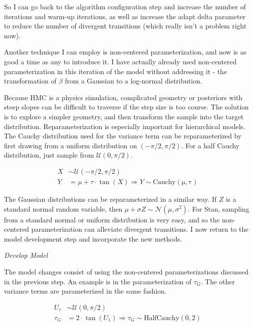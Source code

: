 \documentclass[11pt, oneside, openany]{scrbook}
\begin{document}
So I can go back to the algorithm configuration step and increase the number of iterations and warm-up iterations, as well as increase the adapt delta parameter to reduce the number of divergent transitions (which really isn't a problem right now).

Another technique I can employ is non-centered parameterization, and now is as good a time as any to introduce it. I have actually already used non-centered parameterization in this iteration of the model without addressing it - the transformation of \(\beta\) from a Gaussian to a log-normal distribution.

Because HMC is a physics simulation, complicated geometry or posteriors with steep slopes can be difficult to traverse if the step size is too course. The solution is to explore a simpler geometry, and then transform the sample into the target distribution. Reparameterization is especially important for hierarchical models. The Cauchy distribution used for the variance term can be reparameterized by first drawing from a uniform distribution on \((-\pi/2, \pi/2)\). For a half Cauchy distribution, just sample from \(\mathcal{U}(0, \pi/2)\).


\begin{align*}
X &\sim \mathcal{U}(-\pi/2, \pi/2) \\
Y &= \mu + \tau \cdot \tan(X) \Longrightarrow Y \sim \mathrm{Cauchy(\mu, \tau)}
\end{align*}

The Gaussian distributions can be reparameterized in a similar way. If \(Z\) is a standard normal random variable, then \(\mu + \sigma Z \sim \mathcal{N}(\mu, \sigma^2)\). For Stan, sampling from a standard normal or uniform distribution is very easy, and so the non-centered parameterization can alleviate divergent transitions. I now return to the model development step and incorporate the new methods.

\emph{Develop Model}

The model changes consist of using the non-centered parameterizations discussed in the previous step. An example is in the parameterization of \(\tau_{G}\). The other variance terms are parameterized in the same fashion.


\begin{align*}
U_\tau &\sim \mathcal{U}(0, \pi/2) \\
\tau_{G} &= 2 \cdot \tan(U_1) \Longrightarrow \tau_G \sim \mathrm{HalfCauchy}(0, 2)
\end{align*}
\end{document}
